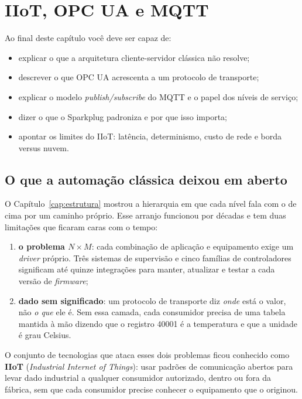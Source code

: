 \chapter{IIoT, OPC UA e MQTT}
\label{cap:iiot}

\begin{objetivos}
Ao final deste capítulo você deve ser capaz de:
\begin{itemize}
  \item explicar o que a arquitetura cliente-servidor clássica não resolve;
  \item descrever o que OPC UA acrescenta a um protocolo de transporte;
  \item explicar o modelo \emph{publish/subscribe} do MQTT e o papel dos níveis de serviço;
  \item dizer o que o Sparkplug padroniza e por que isso importa;
  \item apontar os limites do IIoT: latência, determinismo, custo de rede e borda versus nuvem.
\end{itemize}
\end{objetivos}

\section{O que a automação clássica deixou em aberto}

O Capítulo~\ref{cap:estrutura} mostrou a hierarquia em que cada nível fala com o de cima por um
caminho próprio. Esse arranjo funcionou por décadas e tem duas limitações que ficaram caras com o
tempo:

\begin{enumerate}
  \item \textbf{o problema $N \times M$}: cada combinação de aplicação e equipamento exige um
        \emph{driver} próprio. Três sistemas de supervisão e cinco famílias de controladores
        significam até quinze integrações para manter, atualizar e testar a cada versão de
        \emph{firmware};
  \item \textbf{dado sem significado}: um protocolo de transporte diz \emph{onde} está o valor, não
        \emph{o que} ele é. Sem essa camada, cada consumidor precisa de uma tabela mantida à mão
        dizendo que o registro 40001 é a temperatura e que a unidade é grau Celsius.
\end{enumerate}

O conjunto de tecnologias que ataca esses dois problemas ficou conhecido como \textbf{IIoT}
(\emph{Industrial Internet of Things}): usar padrões de comunicação abertos para levar dado
industrial a qualquer consumidor autorizado, dentro ou fora da fábrica, sem que cada consumidor
precise conhecer o equipamento que o originou.

